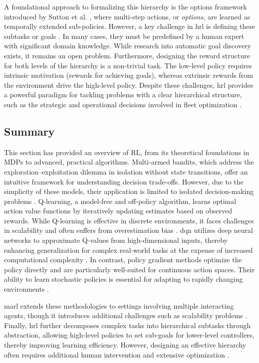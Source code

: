A foundational approach to formalizing this hierarchy is the options framework introduced by Sutton et al. \cite{sutton_between_1999}, where multi-step actions, or \textit{options,} are learned as temporally extended sub-policies.
However, a key challenge in \gls{hrl} is defining these subtasks or goals \cite{pateria_hierarchical_2021}.
In many cases, they must be predefined by a human expert with significant domain knowledge.
While research into automatic goal discovery exists, it remains an open problem.
Furthermore, designing the reward structure for both levels of the hierarchy is a non-trivial task.
The low-level policy requires intrinsic motivation (rewards for achieving goals), whereas extrinsic rewards from the environment drive the high-level policy.
Despite these challenges, \gls{hrl} provides a powerful paradigm for tackling problems with a clear hierarchical structure, such as the strategic and operational decisions involved in fleet optimization \cite{pateria_hierarchical_2021}.

\subsection{Summary}
This section has provided an overview of RL, from its theoretical foundations in MDPs to advanced, practical algorithms.
Multi-armed bandits, which address the exploration–exploitation dilemma in isolation without state transitions, offer an intuitive framework for understanding decision trade-offs.
However, due to the simplicity of these models, their application is limited to isolated decision-making problems \cite{sutton_reinforcement_2018}.
Q-learning, a model-free and off-policy algorithm, learns optimal action value functions by iteratively updating estimates based on observed rewards.
While Q-learning is effective in discrete environments, it faces challenges in scalability and often suffers from overestimation bias \cite{hasselt_deep_2016}.
\gls{dqn} utilizes deep neural networks to approximate Q-values from high-dimensional inputs, thereby enhancing generalization for complex real-world tasks at the expense of increased computational complexity \cite{mnih_human-level_2015}.
In contrast, policy gradient methods optimize the policy directly and are particularly well-suited for continuous action spaces.
Their ability to learn stochastic policies is essential for adapting to rapidly changing environments \cite{sewak_policy-approximation_2022}.

\gls{marl} extends these methodologies to settings involving multiple interacting agents, though it introduces additional challenges such as scalability problems \cite{busoniu_multi-agent_2008}.
Finally, \gls{hrl} further decomposes complex tasks into hierarchical subtasks through abstraction, allowing high-level policies to set sub-goals for lower-level controllers, thereby improving learning efficiency. 
However, designing an effective hierarchy often requires additional human intervention and extensive optimization \cite{pateria_hierarchical_2021}.

